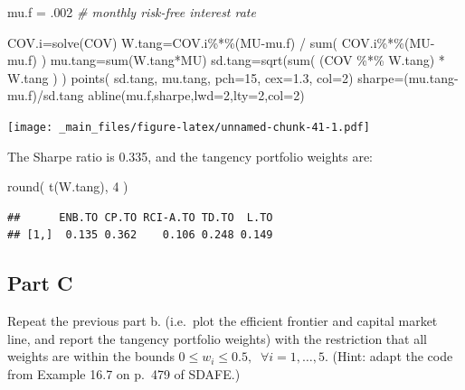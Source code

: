 \documentclass[
  oneside]{book}
\newenvironment{Shaded}{\begin{snugshade}}{\end{snugshade}}
\newcommand{\AttributeTok}[1]{\textcolor[rgb]{0.77,0.63,0.00}{#1}}
\newcommand{\CommentTok}[1]{\textcolor[rgb]{0.56,0.35,0.01}{\textit{#1}}}
\newcommand{\DecValTok}[1]{\textcolor[rgb]{0.00,0.00,0.81}{#1}}
\newcommand{\FloatTok}[1]{\textcolor[rgb]{0.00,0.00,0.81}{#1}}
\newcommand{\FunctionTok}[1]{\textcolor[rgb]{0.00,0.00,0.00}{#1}}
\newcommand{\NormalTok}[1]{#1}
\newcommand{\OtherTok}[1]{\textcolor[rgb]{0.56,0.35,0.01}{#1}}
\newcommand{\SpecialCharTok}[1]{\textcolor[rgb]{0.00,0.00,0.00}{#1}}
\begin{document}
\begin{Shaded}
\begin{Highlighting}[]
\NormalTok{mu.f }\OtherTok{=}\NormalTok{ .}\DecValTok{002} \CommentTok{\# monthly risk{-}free interest rate}

\NormalTok{COV.i}\OtherTok{=}\FunctionTok{solve}\NormalTok{(COV)}
\NormalTok{W.tang}\OtherTok{=}\NormalTok{COV.i}\SpecialCharTok{\%*\%}\NormalTok{(MU}\SpecialCharTok{{-}}\NormalTok{mu.f) }\SpecialCharTok{/} \FunctionTok{sum}\NormalTok{( COV.i}\SpecialCharTok{\%*\%}\NormalTok{(MU}\SpecialCharTok{{-}}\NormalTok{mu.f) )}
\NormalTok{mu.tang}\OtherTok{=}\FunctionTok{sum}\NormalTok{(W.tang}\SpecialCharTok{*}\NormalTok{MU)                             }
\NormalTok{sd.tang}\OtherTok{=}\FunctionTok{sqrt}\NormalTok{(}\FunctionTok{sum}\NormalTok{( (COV }\SpecialCharTok{\%*\%}\NormalTok{ W.tang) }\SpecialCharTok{*}\NormalTok{ W.tang ) )    }
\FunctionTok{points}\NormalTok{( sd.tang, mu.tang, }\AttributeTok{pch=}\DecValTok{15}\NormalTok{, }\AttributeTok{cex=}\FloatTok{1.3}\NormalTok{, }\AttributeTok{col=}\DecValTok{2}\NormalTok{)  }
\NormalTok{sharpe}\OtherTok{=}\NormalTok{(mu.tang}\SpecialCharTok{{-}}\NormalTok{mu.f)}\SpecialCharTok{/}\NormalTok{sd.tang}
\FunctionTok{abline}\NormalTok{(mu.f,sharpe,}\AttributeTok{lwd=}\DecValTok{2}\NormalTok{,}\AttributeTok{lty=}\DecValTok{2}\NormalTok{,}\AttributeTok{col=}\DecValTok{2}\NormalTok{)}
\end{Highlighting}
\end{Shaded}

\texttt{[image: \_main\_files/figure-latex/unnamed-chunk-41-1.pdf]}

The Sharpe ratio is 0.335, and the tangency portfolio weights are:

\begin{Shaded}
\begin{Highlighting}[]
\FunctionTok{round}\NormalTok{( }\FunctionTok{t}\NormalTok{(W.tang), }\DecValTok{4}\NormalTok{ )}
\end{Highlighting}
\end{Shaded}

\begin{verbatim}
##      ENB.TO CP.TO RCI-A.TO TD.TO  L.TO
## [1,]  0.135 0.362    0.106 0.248 0.149
\end{verbatim}

\hypertarget{part-c-3}{%
\subsection{Part C}\label{part-c-3}}

Repeat the previous part b. (i.e.~plot the efficient frontier and capital market line, and report the tangency portfolio weights) with the restriction that all weights are within the bounds \(0 \le w_i \le 0.5,\;\; \forall i = 1, \ldots, 5\).
(Hint: adapt the code from Example 16.7 on p.~479 of SDAFE.)
\end{document}
